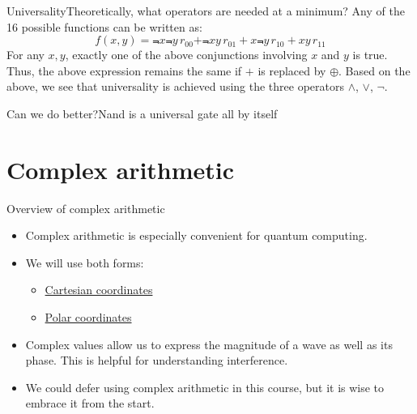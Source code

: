 \begin{frame}{Universality}{Theoretically, what operators are needed at a minimum?}
\MedSkip{}
Any of the 16 possible functions can be written as:
\[
f(x,y) = \Not{x}\Not{y}\,r_{00} +\Not{x}y \,r_{01} + x\Not{y}\, r_{10} +xy \,r_{11} 
\]
For any $x,y$, exactly one of the above conjunctions involving $x$ and $y$ is true.  Thus, the above expression remains the same if $+$ is replaced by $\oplus$.  
\MedSkip{}
Based on the above, we see that universality is achieved using the three operators $\wedge$, $\vee$, $\neg$.
\end{frame}



\begin{frame}{Can we do better?}{Nand is a universal gate all by itself}

\end{frame}

\section{Complex arithmetic}

\begin{frame}{Overview of complex arithmetic}
\begin{itemize}
    \item Complex arithmetic is especially convenient for quantum computing.
    \item We will use both forms:
    \begin{itemize}
        \item \href{https://en.wikipedia.org/wiki/Cartesian_coordinate_system}{Cartesian coordinates}
        \item \href{https://en.wikipedia.org/wiki/Polar_coordinate_system}{Polar coordinates}
    \end{itemize}
    \item Complex values allow us to express the magnitude of a wave as well as its phase.  This is helpful for understanding interference.
    \item We could defer using complex arithmetic in this course, but it is wise to embrace it from the start.
\end{itemize}
\end{frame}

